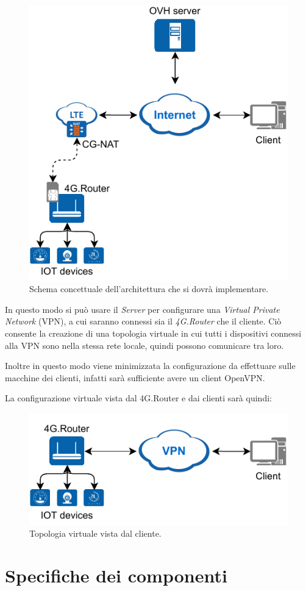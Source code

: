 \begin{figure}[H]
	\centering
	\includegraphics[width=0.5\linewidth]{immagini/diag-real}
	\caption{Schema concettuale dell'architettura che si dovrà implementare.}
	\label{fig:schem_architettura_reale}
\end{figure}

In questo modo si può usare il \textit{Server} per configurare una \textit{Virtual Private Network} (VPN), a cui saranno connessi sia il \textit{4G.Router} che il cliente. Ciò consente la creazione di una topologia virtuale in cui tutti i dispositivi connessi alla VPN sono nella stessa rete locale, quindi possono comunicare tra loro.

Inoltre in questo modo viene minimizzata la configurazione da effettuare sulle macchine dei clienti, infatti sarà sufficiente avere un client OpenVPN.

La configurazione virtuale vista dal 4G.Router e dai clienti sarà quindi:

\begin{figure}[H]
	\centering
	\includegraphics[width=0.5\linewidth]{immagini/diag-virtual}
	\caption{Topologia virtuale vista dal cliente.}
	\label{fig:schema_architettura_virtuale}
\end{figure}

\newpage
\section{Specifiche dei componenti}



